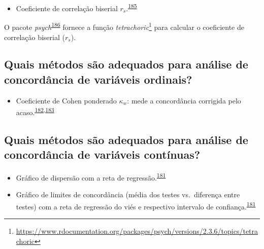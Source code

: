 \documentclass[
  a4paper,
]{book}
\providecommand{\tightlist}{%
  \setlength{\itemsep}{0pt}\setlength{\parskip}{0pt}}
\renewcommand{\href}[2]{#2\footnote{\url{#1}}}
\newenvironment{infobox}[1]
  {
  \begin{itemize}
  \renewcommand{\labelitemi}{
    \raisebox{-.7\height}[0pt][0pt]{
      {\setkeys{Gin}{width=3em,keepaspectratio}
        \texttt{[image: \#1]}}
    }
  }
  \setlength{\fboxsep}{1em}
  \begin{blackbox}
  \item
  }
  {
  \end{blackbox}
  \end{itemize}
  }
\begin{document}
\begin{itemize}
\tightlist
\item
  Coeficiente de correlação biserial \(r_{s}\).\textsuperscript{\protect\hyperlink{ref-banerjee1999}{185}}
\end{itemize}

\begin{infobox}{images/Rlogo}
O pacote \emph{psych}\textsuperscript{\protect\hyperlink{ref-psych}{186}} fornece a função \href{https://www.rdocumentation.org/packages/psych/versions/2.3.6/topics/tetrachoric}{\emph{tetrachoric}} para calcular o coeficiente de correlação biserial (\(r_{s}\)).

\end{infobox}

\hypertarget{quais-muxe9todos-suxe3o-adequados-para-anuxe1lise-de-concorduxe2ncia-de-variuxe1veis-ordinais}{%
\subsection{Quais métodos são adequados para análise de concordância de variáveis ordinais?}\label{quais-muxe9todos-suxe3o-adequados-para-anuxe1lise-de-concorduxe2ncia-de-variuxe1veis-ordinais}}

\begin{itemize}
\tightlist
\item
  Coeficiente de Cohen ponderado \(\kappa_{w}\): mede a concordância corrigida pelo acaso.\textsuperscript{\protect\hyperlink{ref-scott1955}{182},\protect\hyperlink{ref-cohen1960}{183}}
\end{itemize}

\hypertarget{quais-muxe9todos-suxe3o-adequados-para-anuxe1lise-de-concorduxe2ncia-de-variuxe1veis-contuxednuas}{%
\subsection{Quais métodos são adequados para análise de concordância de variáveis contínuas?}\label{quais-muxe9todos-suxe3o-adequados-para-anuxe1lise-de-concorduxe2ncia-de-variuxe1veis-contuxednuas}}

\begin{itemize}
\item
  Gráfico de dispersão com a reta de regressão.\textsuperscript{\protect\hyperlink{ref-altman1983}{181}}
\item
  Gráfico de limites de concordância (média dos testes vs.~diferença entre testes) com a reta de regressão do viés e respectivo intervalo de confiança.\textsuperscript{\protect\hyperlink{ref-altman1983}{181}}
\end{itemize}
\end{document}
